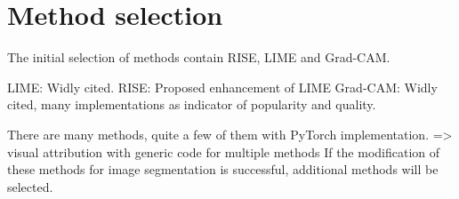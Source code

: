 \section{Method selection}
The initial selection of methods contain RISE, LIME and Grad-CAM.

LIME: Widly cited.
RISE: Proposed enhancement of LIME
Grad-CAM: Widly cited, many implementations as indicator of popularity and quality.

There are many methods, quite a few of them with PyTorch implementation.
=> visual attribution with generic code for multiple methods
If the modification of these methods for image segmentation is successful, additional methods will be selected.
